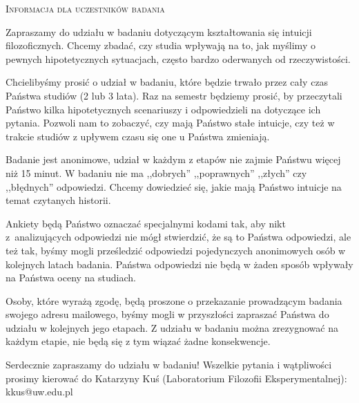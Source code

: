\documentclass[a4paper, polish, 14pt]{extarticle}
\date{\vspace{-5ex}}
\begin{document}
\begin{center}
				\textsc{\Large Informacja dla uczestników badania}
\end{center}

Zapraszamy do udziału w badaniu dotyczącym kształtowania się intuicji filozoficznych. Chcemy zbadać, czy studia wpływają na to, jak myślimy o pewnych hipotetycznych sytuacjach, często bardzo oderwanych od rzeczywistości.

Chcielibyśmy prosić o udział w badaniu, które będzie trwało przez cały czas Państwa studiów (2 lub 3 lata). Raz na semestr będziemy prosić, by przeczytali Państwo kilka hipotetycznych scenariuszy i odpowiedzieli na dotyczące ich pytania. Pozwoli nam to zobaczyć, czy mają Państwo stałe intuicje, czy też w trakcie studiów z upływem czasu się one u Państwa zmieniają.

Badanie jest anonimowe, udział w każdym z etapów nie zajmie Państwu więcej niż 15 minut. W badaniu nie ma ,,dobrych'' ,,poprawnych'' ,,złych'' czy ,,błędnych'' odpowiedzi. Chcemy dowiedzieć się, jakie mają Państwo intuicje na temat czytanych historii. 

Ankiety będą Państwo oznaczać specjalnymi kodami tak, aby nikt z~analizujących odpowiedzi nie mógł stwierdzić, że są to Państwa odpowiedzi, ale też tak, byśmy mogli prześledzić odpowiedzi pojedynczych anonimowych osób w kolejnych latach badania. Państwa odpowiedzi nie będą w żaden sposób wpływały na Państwa oceny na studiach.

Osoby, które wyrażą zgodę, będą proszone o przekazanie prowadzącym badania swojego adresu mailowego, byśmy mogli w przyszłości zapraszać Państwa do udziału w kolejnych jego etapach. Z udziału w badaniu można zrezygnować na każdym etapie, nie będą się z tym wiązać żadne konsekwencje.

Serdecznie zapraszamy do udziału w badaniu! Wszelkie pytania i wątpliwości prosimy kierować do Katarzyny Kuś (Laboratorium Filozofii Eksperymentalnej): \textsf{kkus@uw.edu.pl}
\end{document}
